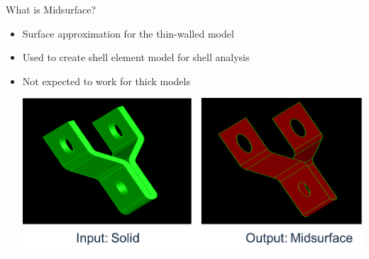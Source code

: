 \begin{frame}{What is Midsurface?}
\begin{itemize}[noitemsep,label=\textbullet,topsep=2pt,parsep=2pt,partopsep=2pt]
\item Surface approximation for the thin-walled model
\item Used to create shell element model for shell analysis
\item Not expected to work for thick models

\vspace{1cm}
\includegraphics[width=0.85\linewidth]{../Common/images/SolidToMidsurface.png}
\end{itemize}


\end{frame}
%
%
%
%
%
%
%
%
%
%
%
